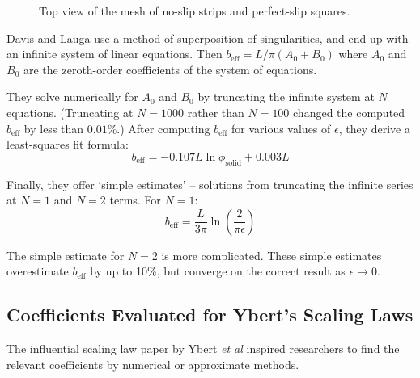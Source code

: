 \documentclass[12pt, a4paper, twoside, openright]{book}
\newcommand{\beff}{\ensuremath{b_{\mathrm{eff}}}}
\newcommand{\phisol}{\ensuremath{\phi_{\mathrm{solid}}}}
\begin{document}
\begin{figure}[ht]
\centering
{}
\caption{Top view of the mesh of no-slip strips and perfect-slip squares.}
\label{mesh}
\end{figure}

Davis and Lauga use a method of superposition of singularities, and end up with an infinite system of linear equations.  Then $\beff = L/\pi (A_0 + B_0)$ where $A_0$ and $B_0$ are the zeroth-order coefficients of the system of equations.

They solve numerically for $A_0$ and $B_0$ by truncating the infinite system at $N$ equations.  (Truncating at $N=1000$ rather than $N=100$ changed the computed $\beff$ by less than $0.01\%$.) After computing $\beff$ for various values of $\epsilon$, they derive a least-squares fit formula:
\begin{equation}
\beff = -0.107 L \ln \phisol + 0.003L
\end{equation}

Finally, they offer `simple estimates' -- solutions from truncating the infinite series at $N=1$ and $N=2$ terms. For $N=1$:
\begin{equation}
\beff = \frac{L}{3\pi} \ln \left( \frac{2}{\pi \epsilon} \right)
\end{equation}

The simple estimate for $N=2$ is more complicated.  These simple estimates overestimate $\beff$ by up to 10\%, but converge on the correct result as $\epsilon \rightarrow 0$.

\subsection{Coefficients Evaluated for Ybert's Scaling Laws}

The influential scaling law paper by Ybert \emph{et al} \cite{Ybert2007} inspired researchers to find the relevant coefficients by numerical or approximate methods.
\end{document}
